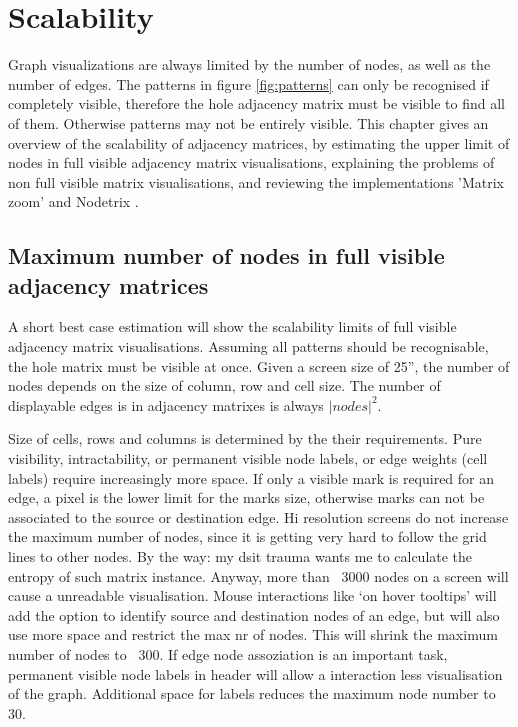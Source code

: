 \chapter{Scalability}
\label{chap:Scalability}

Graph visualizations are always limited by the number of nodes, as well as the number of edges. The patterns in figure \ref{fig:patterns} can only be recognised if completely visible, therefore the hole adjacency matrix must be visible to find all of them. Otherwise patterns may not be entirely visible. This chapter gives an overview of the scalability of adjacency matrices, by estimating the upper limit of nodes in full visible adjacency matrix visualisations, explaining the problems of non full visible matrix visualisations, and reviewing the implementations 'Matrix zoom' \citep{ham-ivis-2003, abello} and Nodetrix \citep{henry}.


\section{Maximum number of nodes in full visible adjacency matrices}
A short best case estimation will show the scalability limits of full visible adjacency matrix visualisations. Assuming all patterns should be recognisable, the hole matrix must be visible at once. Given a screen size of 25”, the number of nodes depends on the size of column, row and cell size. The number of displayable edges is in adjacency matrixes is always $|nodes|^2$.

Size of cells, rows and columns is determined by the their requirements. Pure visibility, intractability, or permanent visible node labels, or edge weights (cell labels) require increasingly more space.
If only a visible mark is required for an edge, a pixel is the lower limit for the marks size, otherwise marks can not be associated to the source or destination edge. Hi resolution screens do not increase the maximum number of nodes, since it is getting very hard to follow the grid lines to other nodes. By the way: my dsit trauma wants me to calculate the entropy of such matrix instance. Anyway, more than ~3000 nodes on a screen will cause a unreadable visualisation.
Mouse interactions like ‘on hover tooltips’ will add the option to identify source and destination nodes of an edge, but will also use more space and restrict the max nr of nodes. This will shrink the maximum number of nodes to ~300.
If edge node assoziation is an important task, permanent visible node labels in header will allow a interaction less visualisation of the graph. Additional space for labels reduces the maximum node number to 30.
 
